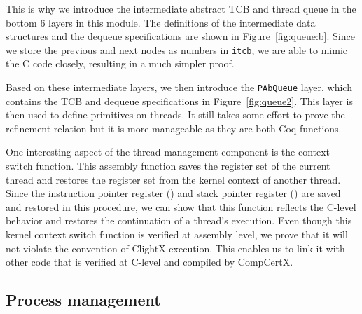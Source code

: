 This is why we introduce the intermediate abstract TCB and thread
queue in the bottom 6 layers in this module.  The definitions of the
intermediate data structures 
and the dequeue specifications are shown in
Figure~\ref{fig:queue:b}.
Since we store the previous and next
nodes as numbers in \verb"itcb", we are able to mimic the C code
closely, resulting in a much simpler proof.

Based on these intermediate layers, we then introduce the
\verb"PAbQueue" layer, which contains the TCB and dequeue specifications in
Figure~\ref{fig:queue2}. This layer is then used to define
primitives on threads.  It still takes some effort to prove the
refinement relation but it is more manageable as they are both Coq
functions. 

One interesting aspect of the thread management component is the 
context switch function. 
This assembly function saves the register set
of the current thread and restores the register set from 
the kernel context of another thread.
Since the instruction pointer register () and stack pointer register () 
are saved and restored in this procedure,
we can show that this function reflects the C-level behavior
and restores the continuation of a thread's execution.
Even though this kernel context switch function is verified at 
assembly level,
we prove that it will not violate the convention of ClightX execution.
This enables us to link it with other code that is verified at C-level
and compiled by CompCertX. 

\subsection{Process management}
\label{sec:base:pm} 


